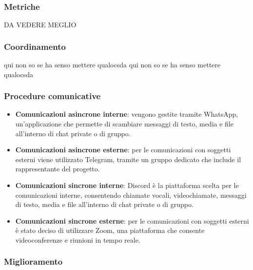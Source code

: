 \subsubsection{Metriche}
DA VEDERE MEGLIO
\subsubsection{Coordinamento}
qui non so se ha senso mettere qualocsda
qui non so se ha senso mettere qualocsda
\subsubsection{Procedure comunicative}
\begin{itemize}  
    \item \textbf{Comunicazioni asincrone interne}: vengono gestite tramite WhatsApp, un'applicazione che permette di scambiare messaggi di testo, media e file all'interno di chat private o di gruppo.  
    \item \textbf{Comunicazioni asincrone esterne}: per le comunicazioni con soggetti esterni viene utilizzato Telegram, tramite un gruppo dedicato che include il rappresentante del progetto.  
\end{itemize}  

\begin{itemize}  
    \item \textbf{Comunicazioni sincrone interne}: Discord è la piattaforma scelta per le comunicazioni interne, consentendo chiamate vocali, videochiamate, messaggi di testo, media e file all'interno di chat private o di gruppo.  
    \item \textbf{Comunicazioni sincrone esterne}: per le comunicazioni con soggetti esterni è stato deciso di utilizzare Zoom, una piattaforma che consente videoconferenze e riunioni in tempo reale.  
\end{itemize}  




\subsubsection{Miglioramento}



